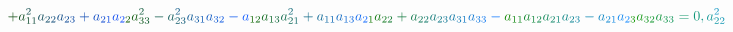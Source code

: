 \documentclass[12pt]{article}
\begin{document}
\begin{displaymath}
\mathcolor[RGB]{15,75,15}{+} \mathcolor[RGB]{15,75,30}{a} _ { \mathcolor[RGB]{15,75,45}{1} \mathcolor[RGB]{15,75,60}{1} } ^ { \mathcolor[RGB]{15,75,75}{2} } \mathcolor[RGB]{15,75,90}{a} _ { \mathcolor[RGB]{15,75,105}{2} \mathcolor[RGB]{15,75,120}{2} } \mathcolor[RGB]{15,75,135}{a} _ { \mathcolor[RGB]{15,75,150}{2} \mathcolor[RGB]{15,75,165}{3} } \mathcolor[RGB]{15,75,180}{+} \mathcolor[RGB]{15,75,195}{a} _ { \mathcolor[RGB]{15,75,210}{2} \mathcolor[RGB]{15,75,225}{1} } \mathcolor[RGB]{15,75,240}{a} _ { \mathcolor[RGB]{15,75,255}{2} \mathcolor[RGB]{15,90,0}{2} } \mathcolor[RGB]{15,90,15}{a} _ { \mathcolor[RGB]{15,90,30}{3} \mathcolor[RGB]{15,90,45}{3} } ^ { \mathcolor[RGB]{15,90,60}{2} } \mathcolor[RGB]{15,90,75}{-} \mathcolor[RGB]{15,90,90}{a} _ { \mathcolor[RGB]{15,90,105}{2} \mathcolor[RGB]{15,90,120}{3} } ^ { \mathcolor[RGB]{15,90,135}{2} } \mathcolor[RGB]{15,90,150}{a} _ { \mathcolor[RGB]{15,90,165}{3} \mathcolor[RGB]{15,90,180}{1} } \mathcolor[RGB]{15,90,195}{a} _ { \mathcolor[RGB]{15,90,210}{3} \mathcolor[RGB]{15,90,225}{2} } \mathcolor[RGB]{15,90,240}{-} \mathcolor[RGB]{15,90,255}{a} _ { \mathcolor[RGB]{15,105,0}{1} \mathcolor[RGB]{15,105,15}{2} } \mathcolor[RGB]{15,105,30}{a} _ { \mathcolor[RGB]{15,105,45}{1} \mathcolor[RGB]{15,105,60}{3} } \mathcolor[RGB]{15,105,75}{a} _ { \mathcolor[RGB]{15,105,90}{2} \mathcolor[RGB]{15,105,105}{1} } ^ { \mathcolor[RGB]{15,105,120}{2} } \mathcolor[RGB]{15,105,135}{+} \mathcolor[RGB]{15,105,150}{a} _ { \mathcolor[RGB]{15,105,165}{1} \mathcolor[RGB]{15,105,180}{1} } \mathcolor[RGB]{15,105,195}{a} _ { \mathcolor[RGB]{15,105,210}{1} \mathcolor[RGB]{15,105,225}{3} } \mathcolor[RGB]{15,105,240}{a} _ { \mathcolor[RGB]{15,105,255}{2} \mathcolor[RGB]{15,120,0}{1} } \mathcolor[RGB]{15,120,15}{a} _ { \mathcolor[RGB]{15,120,30}{2} \mathcolor[RGB]{15,120,45}{2} } \mathcolor[RGB]{15,120,60}{+} \mathcolor[RGB]{15,120,75}{a} _ { \mathcolor[RGB]{15,120,90}{2} \mathcolor[RGB]{15,120,105}{2} } \mathcolor[RGB]{15,120,120}{a} _ { \mathcolor[RGB]{15,120,135}{2} \mathcolor[RGB]{15,120,150}{3} } \mathcolor[RGB]{15,120,165}{a} _ { \mathcolor[RGB]{15,120,180}{3} \mathcolor[RGB]{15,120,195}{1} } \mathcolor[RGB]{15,120,210}{a} _ { \mathcolor[RGB]{15,120,225}{3} \mathcolor[RGB]{15,120,240}{3} } \mathcolor[RGB]{15,120,255}{-} \mathcolor[RGB]{15,135,0}{a} _ { \mathcolor[RGB]{15,135,15}{1} \mathcolor[RGB]{15,135,30}{1} } \mathcolor[RGB]{15,135,45}{a} _ { \mathcolor[RGB]{15,135,60}{1} \mathcolor[RGB]{15,135,75}{2} } \mathcolor[RGB]{15,135,90}{a} _ { \mathcolor[RGB]{15,135,105}{2} \mathcolor[RGB]{15,135,120}{1} } \mathcolor[RGB]{15,135,135}{a} _ { \mathcolor[RGB]{15,135,150}{2} \mathcolor[RGB]{15,135,165}{3} } \mathcolor[RGB]{15,135,180}{-} \mathcolor[RGB]{15,135,195}{a} _ { \mathcolor[RGB]{15,135,210}{2} \mathcolor[RGB]{15,135,225}{1} } \mathcolor[RGB]{15,135,240}{a} _ { \mathcolor[RGB]{15,135,255}{2} \mathcolor[RGB]{15,150,0}{3} } \mathcolor[RGB]{15,150,15}{a} _ { \mathcolor[RGB]{15,150,30}{3} \mathcolor[RGB]{15,150,45}{2} } \mathcolor[RGB]{15,150,60}{a} _ { \mathcolor[RGB]{15,150,75}{3} \mathcolor[RGB]{15,150,90}{3} } \mathcolor[RGB]{15,150,105}{=} \mathcolor[RGB]{15,150,120}{0} \mathcolor[RGB]{15,150,135}{,} \mathcolor[RGB]{15,150,150}{a} _ { \mathcolor[RGB]{15,150,165}{2} \mathcolor[RGB]{15,150,180}{2} } ^ { \mathcolor[RGB]{15,150,195}{2} } 
\end{displaymath}
\end{document}
